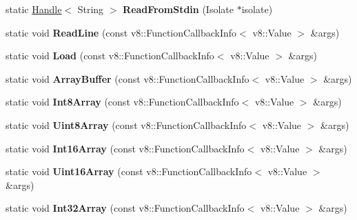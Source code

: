 \begin{DoxyCompactItemize}
\item 
\hypertarget{classv8_1_1_shell_ab8db8633fa7d9c1675d81d1c66952060}{}static \hyperlink{classv8_1_1_handle}{Handle}$<$ String $>$ {\bfseries Read\+From\+Stdin} (Isolate $\ast$isolate)\label{classv8_1_1_shell_ab8db8633fa7d9c1675d81d1c66952060}

\item 
\hypertarget{classv8_1_1_shell_a3f3a76857a48f6e107fe63bcc829396f}{}static void {\bfseries Read\+Line} (const v8\+::\+Function\+Callback\+Info$<$ v8\+::\+Value $>$ \&args)\label{classv8_1_1_shell_a3f3a76857a48f6e107fe63bcc829396f}

\item 
\hypertarget{classv8_1_1_shell_ab4fe0c5dd861c5d36733e2116c793155}{}static void {\bfseries Load} (const v8\+::\+Function\+Callback\+Info$<$ v8\+::\+Value $>$ \&args)\label{classv8_1_1_shell_ab4fe0c5dd861c5d36733e2116c793155}

\item 
\hypertarget{classv8_1_1_shell_ab7f248ef9d6c6820043ce93203001e88}{}static void {\bfseries Array\+Buffer} (const v8\+::\+Function\+Callback\+Info$<$ v8\+::\+Value $>$ \&args)\label{classv8_1_1_shell_ab7f248ef9d6c6820043ce93203001e88}

\item 
\hypertarget{classv8_1_1_shell_a02635142e3f304b43d16f575f313e48c}{}static void {\bfseries Int8\+Array} (const v8\+::\+Function\+Callback\+Info$<$ v8\+::\+Value $>$ \&args)\label{classv8_1_1_shell_a02635142e3f304b43d16f575f313e48c}

\item 
\hypertarget{classv8_1_1_shell_ad5506915b255271b9c5b6809e34282ab}{}static void {\bfseries Uint8\+Array} (const v8\+::\+Function\+Callback\+Info$<$ v8\+::\+Value $>$ \&args)\label{classv8_1_1_shell_ad5506915b255271b9c5b6809e34282ab}

\item 
\hypertarget{classv8_1_1_shell_a9ce851bbc7e9d457db6a839d279ca875}{}static void {\bfseries Int16\+Array} (const v8\+::\+Function\+Callback\+Info$<$ v8\+::\+Value $>$ \&args)\label{classv8_1_1_shell_a9ce851bbc7e9d457db6a839d279ca875}

\item 
\hypertarget{classv8_1_1_shell_a6c8cf6d2ce99e0837d322267c400d5c2}{}static void {\bfseries Uint16\+Array} (const v8\+::\+Function\+Callback\+Info$<$ v8\+::\+Value $>$ \&args)\label{classv8_1_1_shell_a6c8cf6d2ce99e0837d322267c400d5c2}

\item 
\hypertarget{classv8_1_1_shell_a7a773127334f463ac224dd95e2cb1eaf}{}static void {\bfseries Int32\+Array} (const v8\+::\+Function\+Callback\+Info$<$ v8\+::\+Value $>$ \&args)\label{classv8_1_1_shell_a7a773127334f463ac224dd95e2cb1eaf}


\end{DoxyCompactItemize}
